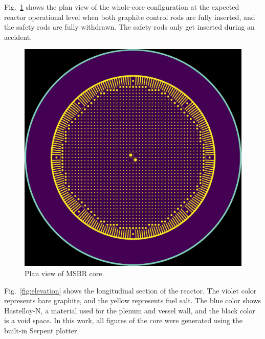 \documentclass{anstrans}
\begin{document}
Fig.~\ref{fig:plan} shows the plan view of the whole-core configuration at the expected reactor operational level when both graphite control rods are fully inserted, and the safety rods are fully withdrawn. The safety rods only get inserted during an accident. 
\begin{figure}[htbp!] %
  \centering
  \vspace{-0.3em}
  \includegraphics[width=0.95\linewidth]{figure_2_1.png}
  \caption{Plan view of \gls{MSBR} core.}
  \vspace{-0.6em}
  \label{fig:plan}
\end{figure}
\FloatBarrier
Fig.~\ref{fig:elevation} shows the longitudinal section of the reactor. The violet color represents bare graphite, and the yellow represents fuel salt. The blue color shows Hastelloy-N, a material used for the plenum and vessel wall, and the black color is a void space. In this work, all figures of the core were generated using the built-in Serpent plotter.
\end{document}
